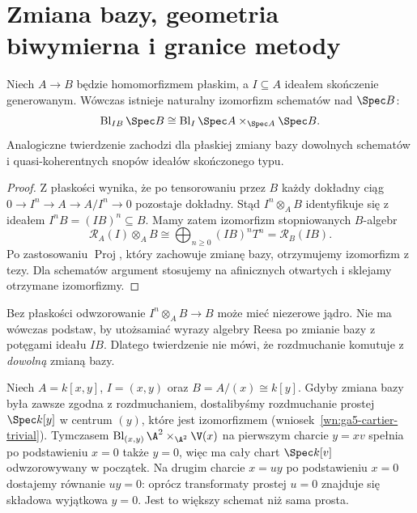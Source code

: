 \section{Zmiana bazy, geometria biwymierna i granice metody}
\label{sec:ga5-basechange}

\begin{twierdzenie}
\label{tw:ga5-flat-basechange}
Niech $A\to B$ będzie homomorfizmem płaskim,
a $I\subseteq A$ ideałem skończenie generowanym.
Wówczas istnieje naturalny izomorfizm schematów nad
$\Spec B$:
\[
 \operatorname{Bl}_{IB}\Spec B\cong
 \operatorname{Bl}_{I}\Spec A\times_{\Spec A}\Spec B.
\]
Analogiczne twierdzenie zachodzi dla płaskiej zmiany
bazy dowolnych schematów i quasi-koherentnych
snopów ideałów skończonego typu.
\end{twierdzenie}
\begin{proof}
Z płaskości wynika, że po tensorowaniu przez $B$
każdy dokładny ciąg
$0\to I^n\to A\to A/I^n\to0$ pozostaje dokładny.
Stąd $I^n\otimes_A B$ identyfikuje się z ideałem
$I^nB=(IB)^n\subseteq B$. Mamy zatem izomorfizm
stopniowanych $B$-algebr
\[
 \mathcal R_A(I)\otimes_A B\cong
 \bigoplus_{n\ge0}(IB)^nT^n=\mathcal R_B(IB).
\]
Po zastosowaniu $\operatorname{Proj}$, który zachowuje
zmianę bazy, otrzymujemy izomorfizm z tezy.
Dla schematów argument stosujemy na afinicznych
otwartych i sklejamy otrzymane izomorfizmy.
\end{proof}

\begin{uwaga}
Bez płaskości odwzorowanie $I^n\otimes_A B\to B$
może mieć niezerowe jądro. Nie ma wówczas podstaw,
by utożsamiać wyrazy algebry Reesa po zmianie bazy
z potęgami ideału $IB$. Dlatego twierdzenie nie mówi,
że rozdmuchanie komutuje z \emph{dowolną} zmianą bazy.
\end{uwaga}

\begin{przyklad}
Niech $A=k[x,y]$, $I=(x,y)$ oraz
$B=A/(x)\cong k[y]$. Gdyby zmiana bazy była zawsze
zgodna z rozdmuchaniem, dostalibyśmy rozdmuchanie
prostej $\Spec k[y]$ w centrum $(y)$, które jest
izomorfizmem (wniosek~\ref{wn:ga5-cartier-trivial}).
Tymczasem
$\operatorname{Bl}_{(x,y)}\A^2\times_{\A^2}\V(x)$
na pierwszym charcie $y=xv$ spełnia po podstawieniu
$x=0$ także $y=0$, więc ma cały chart
$\Spec k[v]$ odwzorowywany w początek.
Na drugim charcie $x=uy$ po podstawieniu $x=0$
dostajemy równanie $uy=0$: oprócz transformaty
prostej $u=0$ znajduje się składowa wyjątkowa
$y=0$. Jest to większy schemat niż sama prosta.
\end{przyklad}

